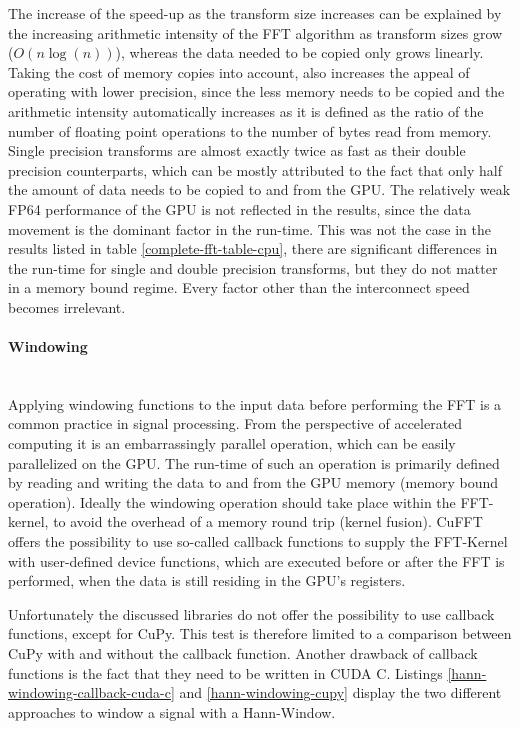\documentclass[english,11pt,a4paper,table]{article} %
\begin{document}
The increase of the speed-up as the transform size increases can be explained by the increasing arithmetic intensity of the FFT algorithm as transform sizes grow ($O(n \log(n))$), whereas the data needed to be copied only grows linearly.
Taking the cost of memory copies into account, also increases the appeal of operating with lower precision, since the less memory needs to be copied and the arithmetic intensity automatically increases as it is defined as the ratio of the number of floating point operations to the number of bytes read from memory.
Single precision transforms are almost exactly twice as fast as their double precision counterparts, which can be mostly attributed to the fact that only half the amount of data needs to be copied to and from the GPU.
The relatively weak FP64 performance of the GPU is not reflected in the results, since the data movement is the dominant factor in the run-time.
This was not the case in the results listed in table \ref{complete-fft-table-cpu}, there are significant differences in the run-time for single and double precision transforms, but they do not matter in a memory bound regime.
Every factor other than the interconnect speed becomes irrelevant.

\paragraph{Windowing}\mbox{}\\

Applying windowing functions to the input data before performing the FFT is a common practice in signal processing.
From the perspective of accelerated computing it is an embarrassingly parallel operation, which can be easily parallelized on the GPU.
The run-time of such an operation is primarily defined by reading and writing the data to and from the GPU memory (memory bound operation).
Ideally the windowing operation should take place within the FFT-kernel, to avoid the overhead of a memory round trip (kernel fusion).
CuFFT offers the possibility to use so-called callback functions to supply the FFT-Kernel with user-defined device functions, which are executed before or after the FFT is performed, when the data is still residing in the GPU's registers.

Unfortunately the discussed libraries do not offer the possibility to use callback functions, except for CuPy. \cite{cupyfftc93:online}
This test is therefore limited to a comparison between CuPy with and without the callback function.
Another drawback of callback functions is the fact that they need to be written in CUDA C.
Listings \ref{hann-windowing-callback-cuda-c} and \ref{hann-windowing-cupy} display the two different approaches to window a signal with a Hann-Window.
\end{document}
